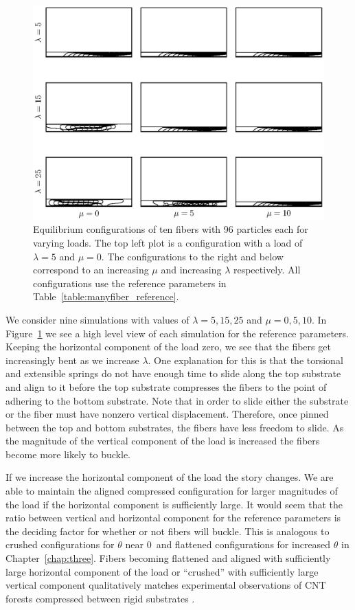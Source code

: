 	\begin{figure}
		\begin{center}
			\includegraphics[scale=1]{./fig/ch4/grid.eps}
		\end{center}		
		\caption{Equilibrium configurations of ten fibers with 96 particles each for varying loads. The top left plot is a configuration with a load of $\lambda = 5$ and $\mu = 0$. The configurations to the right and below correspond to an increasing $\mu$ and increasing $\lambda$ respectively. All configurations use the reference parameters in Table~\ref{table:manyfiber_reference}.
		\label{fig:grid}}
	\end{figure}
	
	We consider nine simulations with values of $\lambda = 5, 15, 25$ and $\mu = 0, 5, 10$. In Figure~\ref{fig:grid} we see a high level view of each simulation for the reference parameters. Keeping the horizontal component of the load zero, we see that the fibers get increasingly bent as we increase $\lambda$. One explanation for this is that the torsional and extensible springs do not have enough time to slide along the top substrate and align to it before the top substrate compresses the fibers to the point of adhering to the bottom substrate. Note that in order to slide either the substrate or the fiber must have nonzero vertical displacement. Therefore, once pinned between the top and bottom substrates, the fibers have less freedom to slide. As the magnitude of the vertical component of the load is increased the fibers become more likely to buckle. 
	
	If we increase the horizontal component of the load the story changes. We are able to maintain the aligned compressed configuration for larger magnitudes of the load if the horizontal component is sufficiently large. It would seem that the ratio between vertical and horizontal component for the reference parameters is the deciding factor for whether or not fibers will buckle. This is analogous to crushed configurations for $\theta$ near $0$\textdegree\ and flattened configurations for increased $\theta$ in Chapter~\ref{chap:three}. Fibers becoming flattened and aligned with sufficiently large horizontal component of the load or ``crushed'' with sufficiently large vertical component qualitatively matches experimental observations of CNT forests compressed between rigid substrates \cite{Qu2008}.

